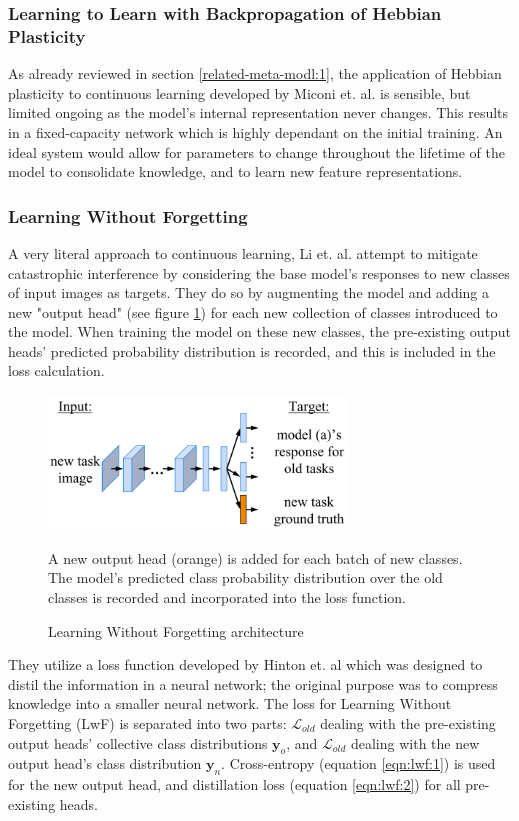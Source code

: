 \documentclass{report}
\begin{document}
	\subsubsection{Learning to Learn with Backpropagation of Hebbian Plasticity}
	As already reviewed in section \ref{related-meta-modl:1}, the application of Hebbian plasticity to continuous learning developed by Miconi et. al. \parencite{ltlwbohb} is sensible, but limited ongoing as the model's internal representation never changes. This results in a fixed-capacity network which is highly dependant on the initial training. An ideal system would allow for parameters to change throughout the lifetime of the model to consolidate knowledge, and to learn new feature representations.
	
	\subsubsection{Learning Without Forgetting}
	A very literal approach to continuous learning, Li et. al. \parencite{lwf} attempt to mitigate catastrophic interference by considering the base model's responses to new classes of input images as targets. They do so by augmenting the model and adding a new "output head" (see figure \ref{fig:lwf:1}) for each new collection of classes introduced to the model. When training the model on these new classes, the pre-existing output heads' predicted probability distribution is recorded, and this is included in the loss calculation. \newline
	\begin{figure}[h]
		\centering
		\includegraphics[width=8cm]{lwfarchitecture}
		\caption{Learning Without Forgetting architecture}
		A new output head (orange) is added for each batch of new classes. The model's predicted class probability distribution over the old classes is recorded and incorporated into the loss function. 
		\label{fig:lwf:1}
	\end{figure}
	They utilize a loss function developed by Hinton et. al \parencite{distillation} which was designed to distil the information in a neural network; the original purpose was to compress knowledge into a smaller neural network. The loss for Learning Without Forgetting (LwF) is separated into two parts: $\mathcal{L}_{old}$ dealing with the pre-existing output heads' collective class distributions $\bm{y}_o$, and $\mathcal{L}_{old}$ dealing with the new output head's class distribution $\bm{y}_n$. Cross-entropy (equation \ref{eqn:lwf:1}) is used for the new output head, and distillation loss (equation \ref{eqn:lwf:2}) for all pre-existing heads. \par
\end{document}
